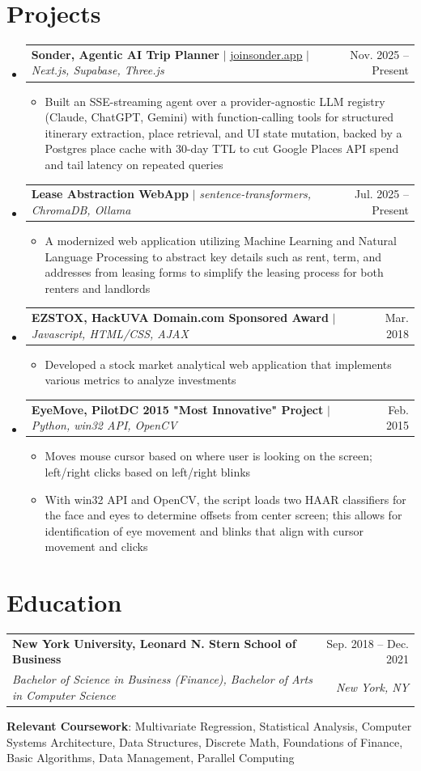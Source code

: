 \documentclass[letterpaper,11pt]{article}
\makeatletter
\newcommand{\resumeItem}[1]{
  \item\small{
    {#1 \vspace{-2pt}}
  }
}
\newcommand{\resumeSubheading}[4]{
  \vspace{-2pt}\item
    \begin{tabular*}{0.97\textwidth}[t]{l@{\extracolsep{\fill}}r}
      \textbf{#1} & #2 \\
      \textit{\small#3} & \textit{\small #4} \\
    \end{tabular*}\vspace{-7pt}
}
\newcommand{\resumeProjectHeading}[2]{
    \item
    \begin{tabular*}{0.97\textwidth}{l@{\extracolsep{\fill}}r}
      \small#1 & #2 \\
    \end{tabular*}\vspace{-7pt}
}
\newcommand{\resumeSubHeadingListStart}{\begin{itemize}[leftmargin=0.15in, label={}]}
\newcommand{\resumeSubHeadingListEnd}{\end{itemize}}
\newcommand{\resumeItemListStart}{\begin{itemize}}
\newcommand{\resumeItemListEnd}{\end{itemize}\vspace{-5pt}}
\makeatother
\begin{document}
\section{Projects}
    \resumeSubHeadingListStart
        \resumeProjectHeading
          {\textbf{Sonder, Agentic AI Trip Planner} $|$ \href{https://www.joinsonder.app}{\underline{joinsonder.app}} $|$ \emph{Next.js, Supabase, Three.js}}
          {Nov. 2025 -- Present}
          \resumeItemListStart
            \resumeItem{Built an SSE-streaming agent over a provider-agnostic LLM registry (Claude, ChatGPT, Gemini) with function-calling tools for structured itinerary extraction, place retrieval, and UI state mutation, backed by a Postgres place cache with 30-day TTL to cut Google Places API spend and tail latency on repeated queries}
          \resumeItemListEnd
        \resumeProjectHeading
          {\textbf{Lease Abstraction WebApp} $|$ \emph{sentence-transformers, ChromaDB, Ollama}}
          {Jul. 2025 -- Present}
          \resumeItemListStart
            \resumeItem{A modernized web application utilizing Machine Learning and Natural Language Processing to abstract key details such as rent, term, and addresses from leasing forms to simplify the leasing process for both renters and landlords}
          \resumeItemListEnd
        \resumeProjectHeading
          {\textbf{EZSTOX, HackUVA Domain.com Sponsored Award} $|$ \emph{Javascript, HTML/CSS, AJAX}}{Mar. 2018}
          \resumeItemListStart
            \resumeItem{Developed a stock market analytical web application that implements various metrics to analyze investments}
          \resumeItemListEnd
        \resumeProjectHeading
          {\textbf{EyeMove, PilotDC 2015 "Most Innovative" Project} $|$ \emph{Python, win32 API, OpenCV}}{Feb. 2015}
          \resumeItemListStart
            \resumeItem{Moves mouse cursor based on where user is looking on the screen; left/right clicks based on left/right blinks}
            \resumeItem{With win32 API and OpenCV, the script loads two HAAR classifiers for the face and eyes to determine offsets from center screen; this allows for identification of eye movement and blinks that align with cursor movement and clicks}
          \resumeItemListEnd
    \resumeSubHeadingListEnd

\section{Education}
  \resumeSubHeadingListStart
    \resumeSubheading
      {New York University, Leonard N. Stern School of Business}{Sep. 2018 -- Dec. 2021}
      {Bachelor of Science in Business (Finance), Bachelor of Arts in Computer Science}{New York, NY}
    \small{\item{
        \textbf{Relevant Coursework}{: Multivariate Regression, Statistical Analysis, Computer Systems Architecture, Data Structures, Discrete Math, Foundations of Finance, Basic Algorithms, Data Management, Parallel Computing} \\
    }}
  \resumeSubHeadingListEnd
\end{document}
